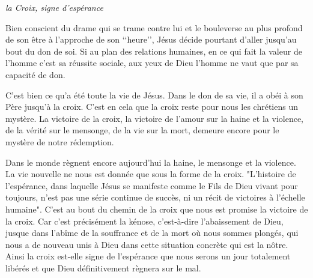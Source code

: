 \og \textit{la Croix, signe d’espérance} \fg

Bien conscient du drame qui se trame contre lui et le bouleverse au plus profond de son être à l’approche de son ‘‘heure’’, Jésus décide pourtant d’aller jusqu’au bout du don de soi. Si au plan des relations humaines, en ce qui fait la valeur de l’homme c’est sa réussite sociale, aux yeux de Dieu l’homme ne vaut que par sa capacité de don. 

C’est bien ce qu’a été toute la vie de Jésus. Dans le don de sa vie, il a obéi à son Père jusqu’à la croix. C’est en cela que la croix reste pour nous les chrétiens un mystère. La victoire de la croix, la victoire de l'amour sur la haine et la violence, de la vérité sur le mensonge, de la vie sur la mort, demeure encore pour le mystère de notre rédemption. 

Dans le monde règnent encore aujourd'hui la haine, le mensonge et la violence. La vie nouvelle ne nous est donnée que sous la forme de la croix. "L'histoire de l'espérance, dans laquelle Jésus se manifeste comme le Fils de Dieu vivant pour toujours, n'est pas une série continue de succès, ni un récit de victoires à l'échelle humaine". C'est au bout du chemin de la croix que nous est promise la victoire de la croix. Car c'est précisément la kénose, c’est-à-dire l'abaissement de Dieu, jusque dans l'abîme de la souffrance et de la mort où nous sommes plongés, qui nous a de nouveau unis à Dieu dans cette situation concrète qui est la nôtre. Ainsi la croix est-elle signe de l'espérance que nous serons un jour totalement libérés et que Dieu définitivement règnera sur le mal.

